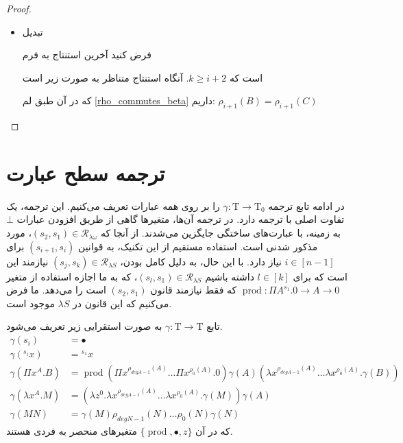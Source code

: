 \begin{proof}
\begin{itemize}
\item تبدیل

فرض کنید آخرین استنتاج به فرم
\begin{prooftree}
\end{prooftree}
است که
$k \ge i+2$.
آنگاه استنتاج متناظر به صورت زیر است
\begin{prooftree}
\end{prooftree}
که در آن طبق لم
\ref{rho_commutes_beta}
داریم:
$\rho_{i+1}(B) = \rho_{i+1}(C)$
\end{itemize}

\end{proof}

\section{ترجمه سطح عبارت}

در ادامه تابع ترجمه
$\gamma : \mathrm{T} \to \mathrm{T}_0$
را بر روی همه عبارات تعریف می‌کنیم.
این ترجمه، یک تفاوت اصلی با ترجمه
 \cite{geuvers1991}
دارد. در ترجمه آن‌ها، متغیرها گاهی از طریق افزودن عبارات
$\bot$
به زمینه، با عبارت‌های ساختگی جایگزین می‌شدند. از آنجا که
$(s_2,s_1) \in \mathcal{R}_{\lambda \omega}$،
مورد مذکور شدنی است. استفاده مستقیم از این تکنیک، به قوانین
$(s_{i+1},s_i)$ برای $i \in [n-1]$ نیاز دارد.
با این حال، به دلیل کامل بودن،
$(s_j,s_k) \in \mathcal{R}_{\lambda S}$
نیازمند این است که برای
$l \in [k]$
داشته باشیم
$(s_l,s_1) \in \mathcal{R}_{\lambda S}$،
که به ما اجازه استفاده از متغیر
$\operatorname{prod} : \Pi A^{s_1}.0 \to A \to 0$
که فقط نیازمند قانون
$(s_2,s_1)$ است را می‌دهد.
ما فرض می‌کنیم که این قانون در
$\lambda S$ موجود است.

\begin{defn}
تابع
$\gamma : \mathrm{T} \to \mathrm{T}$
به صورت استقرایی زیر تعریف می‌شود.
\begin{align*}
\gamma(s_i) &= \bullet\\
\gamma({}^{s_i}x) &= {}^{s_1}x\\
\gamma(\Pi x^A.B) &= \operatorname{prod}(\Pi x^{\rho_{deg A - 1}(A)} \dots \Pi x^{\rho_{0}(A)}.0) \gamma(A) (\lambda x^{\rho_{deg A - 1}(A)} \dots \lambda x^{\rho_{0}(A)}.\gamma(B))\\
\gamma(\lambda x^A.M) &= (\lambda z^0.\lambda x^{\rho_{deg A - 1}(A)} \dots \lambda x^{\rho_{0}(A)}.\gamma(M)) \gamma(A)\\
\gamma(MN) &= \gamma(M) \rho_{degN-1}(N) \dots \rho_{0}(N) \gamma(N)
\end{align*}
که در آن
$\{\operatorname{prod}, \bullet, z\}$
متغیرهای منحصر به فردی هستند.
\end{defn}

